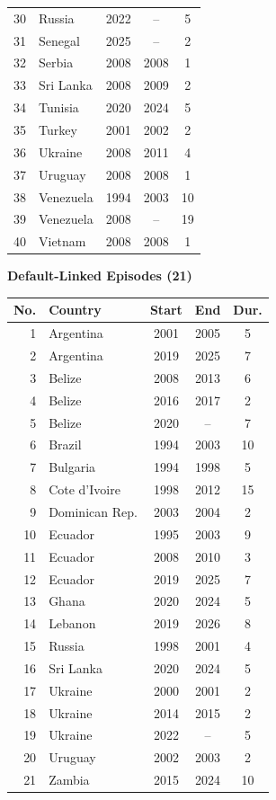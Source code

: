 \documentclass[12pt]{article}
\begin{document}
\begin{table}[th]
\begin{minipage}[t]{0.48\textwidth}
\begin{tabular}{rlccc}
30 & Russia & 2022 & -- & 5 \\
31 & Senegal & 2025 & -- & 2 \\
32 & Serbia & 2008 & 2008 & 1 \\
33 & Sri Lanka & 2008 & 2009 & 2 \\
34 & Tunisia & 2020 & 2024 & 5 \\
35 & Turkey & 2001 & 2002 & 2 \\
36 & Ukraine & 2008 & 2011 & 4 \\
37 & Uruguay & 2008 & 2008 & 1 \\
38 & Venezuela & 1994 & 2003 & 10 \\
39 & Venezuela & 2008 & -- & 19 \\
40 & Vietnam & 2008 & 2008 & 1 \\
\bottomrule
\end{tabular}
\end{minipage}
\hfill
\begin{minipage}[t]{0.48\textwidth}
\centering
\textbf{Default-Linked Episodes (21)}\\[2pt]
\begin{tabular}{rlccc}
\toprule
No. & Country & Start & End & Dur. \\
\midrule
1 & Argentina & 2001 & 2005 & 5 \\
2 & Argentina & 2019 & 2025 & 7 \\
3 & Belize & 2008 & 2013 & 6 \\
4 & Belize & 2016 & 2017 & 2 \\
5 & Belize & 2020 & -- & 7 \\
6 & Brazil & 1994 & 2003 & 10 \\
7 & Bulgaria & 1994 & 1998 & 5 \\
8 & Cote d'Ivoire & 1998 & 2012 & 15 \\
9 & Dominican Rep. & 2003 & 2004 & 2 \\
10 & Ecuador & 1995 & 2003 & 9 \\
11 & Ecuador & 2008 & 2010 & 3 \\
12 & Ecuador & 2019 & 2025 & 7 \\
13 & Ghana & 2020 & 2024 & 5 \\
14 & Lebanon & 2019 & 2026 & 8 \\
15 & Russia & 1998 & 2001 & 4 \\
16 & Sri Lanka & 2020 & 2024 & 5 \\
17 & Ukraine & 2000 & 2001 & 2 \\
18 & Ukraine & 2014 & 2015 & 2 \\
19 & Ukraine & 2022 & -- & 5 \\
20 & Uruguay & 2002 & 2003 & 2 \\
21 & Zambia & 2015 & 2024 & 10 \\
\bottomrule
\end{tabular}
\end{minipage}
\end{table}
\end{document}
